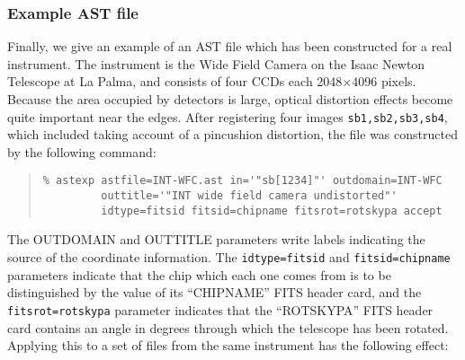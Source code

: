 \documentclass[twoside,11pt]{article}
\renewcommand{\_}{\texttt{\symbol{95}}}
\newenvironment{myquote}{\begin{quote}\begin{small}}{\end{small}\end{quote}}
\begin{document}
\subsubsection{Example AST file}

Finally, we give an example of an AST file which 
has been constructed for a real 
instrument.  The instrument is the Wide Field Camera on
the Isaac Newton Telescope at La Palma,
and consists of four CCDs each 2048$\times$4096 pixels.
Because the area occupied by detectors is large, 
optical distortion effects become quite important near the edges.
After registering four images {\tt sb1,sb2,sb3,sb4},
which included taking account of a pincushion distortion,
the file was constructed by the following command:
\begin{myquote}
\begin{verbatim}
% astexp astfile=INT-WFC.ast in='"sb[1234]"' outdomain=INT-WFC
         outtitle='"INT wide field camera undistorted"'
         idtype=fitsid fitsid=chipname fitsrot=rotskypa accept
\end{verbatim}
\end{myquote}
The OUTDOMAIN and OUTTITLE parameters write labels indicating 
the source of the coordinate information.
The {\tt idtype=fitsid} and {\tt fitsid=chipname} parameters 
indicate that the chip which each
one comes from is to be distinguished by the value of its
``CHIPNAME'' FITS header card, and the {\tt fitsrot=rotskypa}
parameter indicates that the ``ROTSKYPA'' FITS header card
contains an angle in degrees through which the telescope has
been rotated.
Applying this to a set of files from the same instrument has
the following effect:
\end{document}
